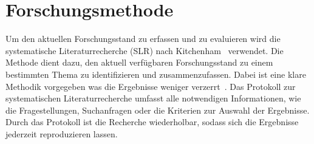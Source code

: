 \documentclass[conference,compsoc,ngerman]{IEEEtran}
\begin{document}
%






\section{Forschungsmethode}\label{s:forschungsmethode}
Um den aktuellen Forschungsstand zu erfassen und zu evaluieren wird die systematische Literaturrecherche (SLR) nach Kitchenham~\cite{kitchenham2004evidence,keele2007guidelines} verwendet. Die Methode dient dazu, den aktuell verfügbaren Forschungsstand zu einem bestimmten Thema zu identifizieren und zusammenzufassen. Dabei ist eine klare Methodik vorgegeben was die Ergebnisse weniger verzerrt~\cite{keele2007guidelines}.
Das Protokoll zur systematischen Literaturrecherche umfasst alle notwendigen Informationen, wie die Fragestellungen, Suchanfragen oder die Kriterien zur Auswahl der Ergebnisse. Durch das Protokoll ist die Recherche wiederholbar, sodass sich die Ergebnisse jederzeit reproduzieren lassen.
\end{document}
